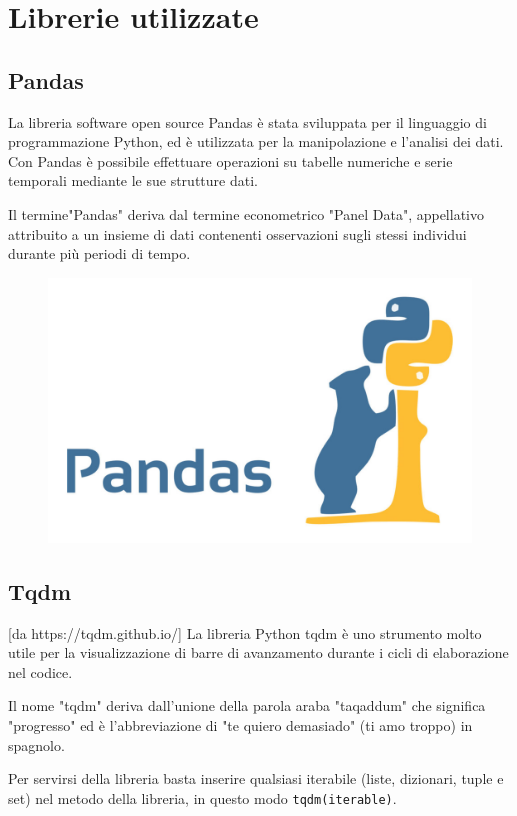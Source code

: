 \section{Librerie utilizzate}
\subsection{Pandas}
La libreria software open source Pandas è stata sviluppata per il linguaggio di programmazione Python, ed è utilizzata per la manipolazione e l'analisi dei dati. Con Pandas è possibile effettuare operazioni su tabelle numeriche e serie temporali mediante le sue strutture dati. 

Il termine"Pandas" deriva dal termine econometrico "Panel Data", appellativo attribuito a un insieme di dati contenenti osservazioni sugli stessi individui durante più periodi di tempo.

\begin{figure}
    \begin{center}    
        \includegraphics[width=0.9\linewidth]{images/image4.jpeg}
    \end{center}
\end{figure}

\subsection{Tqdm}
[da https://tqdm.github.io/]
La libreria Python tqdm è uno strumento molto utile per la visualizzazione di barre di avanzamento durante i cicli di elaborazione nel codice. 

Il nome "tqdm" deriva dall'unione della parola araba "taqaddum" che significa "progresso" ed è l'abbreviazione di "te quiero demasiado" (ti amo troppo) in spagnolo. 

Per servirsi della libreria basta inserire qualsiasi iterabile (liste, dizionari, tuple e set) nel metodo della libreria, in questo modo \texttt{tqdm(iterable)}. 

